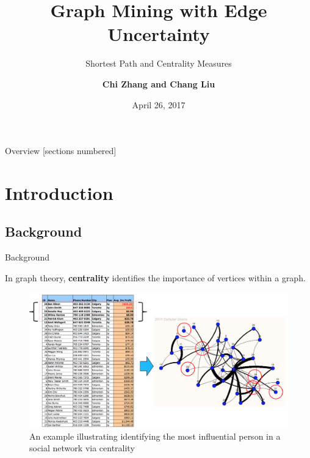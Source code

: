 \documentclass[10pt]{beamer}
\title{Graph Mining with Edge Uncertainty}
\subtitle{Shortest Path and Centrality Measures}
\date{April 26, 2017}
\author{\textbf{Chi Zhang and Chang Liu}}
\newcommand{\themename}{\textbf{\textsc{metropolis}}\xspace}
\begin{document}
\maketitle

\begin{frame}{Overview}
  [sections numbered]
  \vspace{0.1in}
  \tableofcontents
\end{frame}

\section{Introduction}
\subsection{Background}
\begin{frame}[fragile]{Background}





In graph theory, \textbf{centrality} identifies the importance of vertices within a graph.
\vspace{-0.11in}
\begin{figure}[H]
\centering
\includegraphics[scale = 0.29]{famous_example.png}
\caption{An example illustrating identifying the most influential person in a social network via centrality}
\end{figure}
\end{frame}
\end{document}
